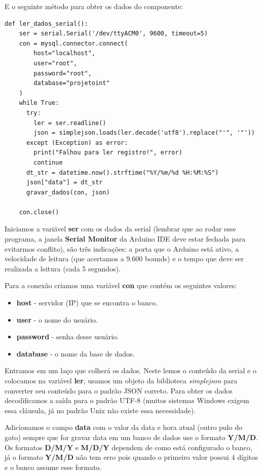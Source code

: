 \documentclass[a4paper,11pt]{article}
\begin{document}
E o seguinte método para obter os dados do componente:
\begin{lstlisting}[]
  def ler_dados_serial():
    ser = serial.Serial('/dev/ttyACM0', 9600, timeout=5)
    con = mysql.connector.connect(
        host="localhost",
        user="root",
        password="root",
        database="projetoint"
    )    
    while True:
      try:
        ler = ser.readline()
        json = simplejson.loads(ler.decode('utf8').replace("'", '"'))
      except (Exception) as error:
        print("Falhou para ler registro!", error)
        continue
      dt_str = datetime.now().strftime("%Y/%m/%d %H:%M:%S")
      json["data"] = dt_str
      gravar_dados(con, json)

    con.close()
\end{lstlisting}

Iniciamos a variável \textbf{ser} com os dados da serial (lembrar que ao rodar esse programa, a janela \textbf{Serial Monitor} da Arduino IDE deve estar fechada para evitarmos conflito), são três indicações: a porta que o Arduino está ativo, a velocidade de leitura (que acertamos a 9.600 bounds) e o tempo que deve ser realizada a leitura (cada 5 segundos). 

Para a conexão criamos uma variável \textbf{con} que contém os seguintes valores: \vspace{-1em}
\begin{itemize}[nolistsep]
	\item \textbf{host} - servidor (IP) que se encontra o banco.
	\item \textbf{user} - o nome do usuário.
	\item \textbf{password} - senha desse usuário.
	\item \textbf{database} - o nome da base de dados.
\end{itemize}

Entramos em um laço que colherá os dados. Neste lemos o conteúdo da serial e o colocamos na variável \textbf{ler}, usamos um objeto da biblioteca \textit{simplejson} para converter seu conteúdo para o padrão JSON correto. Para obter os dados decodificamos a saída para o padrão UTF-8 (muitos sistemas Windows exigem essa cláusula, já no padrão Unix não existe essa necessidade). 

Adicionamos o campo \textbf{data} com o valor da data e hora atual (outro pulo do gato) sempre que for gravar data em um banco de dados use o formato \textbf{Y/M/D}. Os formatos \textbf{D/M/Y} e \textbf{M/D/Y} dependem de como está configurado o banco, já o formato \textbf{Y/M/D} não tem erro pois quando o primeiro valor possui 4 dígitos e o banco assume esse formato. 
\end{document}
